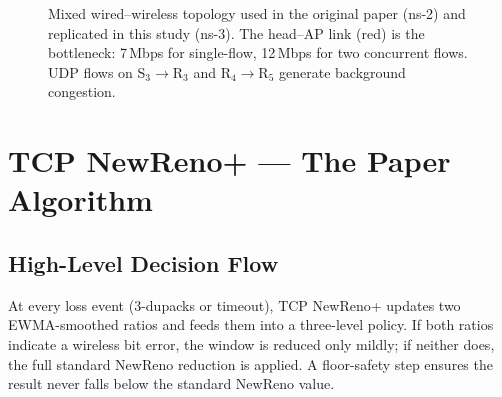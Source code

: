 \documentclass[12pt,a4paper]{article}
\begin{document}
\begin{figure}[H]
\caption{Mixed wired–wireless topology used in the original paper (ns-2) and
replicated in this study (ns-3). The head–AP link (red) is the bottleneck:
7\,Mbps for single-flow, 12\,Mbps for two concurrent flows. UDP flows on
S$_3{\to}$R$_3$ and R$_4{\to}$R$_5$ generate background congestion.}
\label{fig:paper-topo}
\end{figure}

\section{TCP NewReno+ — The Paper Algorithm}
\label{sec:newreno-plus}

\subsection{High-Level Decision Flow}

At every loss event (3-dupacks or timeout), TCP NewReno+ updates two EWMA-smoothed
ratios and feeds them into a three-level policy. If both ratios indicate a wireless
bit error, the window is reduced only mildly; if neither does, the full standard
NewReno reduction is applied. A floor-safety step ensures the result never falls
below the standard NewReno value.
\end{document}
